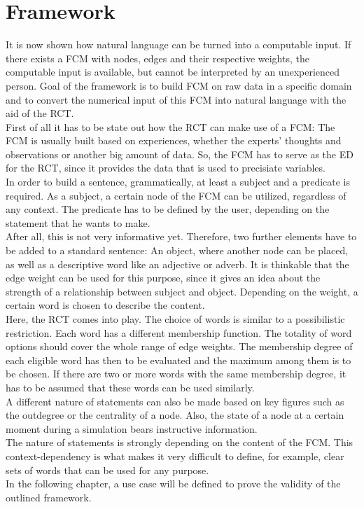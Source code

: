 \documentclass[conference]{IEEEtran}
\begin{document}
\section{Framework}
\label{sec:framework}
It is now shown how natural language can be turned into a computable input. If there exists a FCM with nodes, edges and their respective weights, the computable input is available, but cannot be interpreted by an unexperienced person. Goal of the framework is to build FCM on raw data in a specific domain and to convert the numerical input of this FCM into natural language with the aid of the RCT.\\
First of all it has to be state out how the RCT can make use of a FCM: The FCM is usually built based on experiences, whether the experts' thoughts and observations or another big amount of data. So, the FCM has to serve as the ED for the RCT, since it provides the data that is used to precisiate variables.\\
In order to build a sentence, grammatically, at least a subject and a predicate is required. As a subject, a certain node of the FCM can be utilized, regardless of any context. The predicate has to be defined by the user, depending on the statement that he wants to make.\\
After all, this is not very informative yet. Therefore, two further elements have to be added to a standard sentence: An object, where another node can be placed, as well as a descriptive word like an adjective or adverb. It is thinkable that the edge weight can be used for this purpose, since it gives an idea about the strength of a relationship between subject and object. Depending on the weight, a certain word is chosen to describe the content.\\
Here, the RCT comes into play. The choice of words is similar to a possibilistic restriction. Each word has a different membership function. The totality of word options should cover the whole range of edge weights. The membership degree of each eligible word has then to be evaluated and the maximum among them is to be chosen. If there are two or more words with the same membership degree, it has to be assumed that these words can be used similarly.\\
A different nature of statements can also be made based on key figures such as the outdegree or the centrality of a node. Also, the state of a node at a certain moment during a simulation bears instructive information.\\
The nature of statements is strongly depending on the content of the FCM. This context-dependency is what makes it very difficult to define, for example, clear sets of words that can be used for any purpose.\\
In the following chapter, a use case will be defined to prove the validity of the outlined framework.
\end{document}
